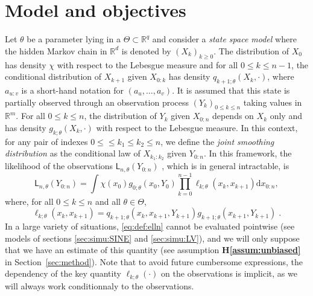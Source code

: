 \documentclass{article}
\newcommand{\md}[1]{g_{#1}}
\newcommand{\llh}[1]{\mathsf{L}_{#1}}
\newcommand{\parvec}{\theta}
\newcommand{\parspace}{\Theta}
\newcommand{\hd}[1]{q_{#1}}
\newcommand{\rset}{\ensuremath{\mathbb{R}}}
\newcommand{\rmd}{\ensuremath{\mathrm{d}}}
\newcommand{\eqsp}{\;}
\newcommand{\qg}[1]{\ell_{#1}}
\newcommand{\sfd}{\mathsf{d}}
\begin{document}
\section{Model and objectives}
\label{sec:model}



%

Let $\parvec$ be a parameter lying in a $\Theta\subset \rset^q$ and consider a  \textit{state space model} where the hidden Markov chain  in $\rset^d$ is denoted by $(X_k)_{k\geqslant 0}$. The distribution of $X_0$ has density $\chi$ with respect to the Lebesgue measure and for all $0\leqslant k \leqslant n-1$, the conditional distribution of $X_{k+1} $ given $X_{0:k}$ has density $\hd{k+1;\parvec}(X_{k},\cdot)$, where $a_{u:v}$ is a short-hand notation for $(a_u,\ldots,a_v)$. 
It is assumed that this state  is partially observed  through an observation process $(Y_k)_{0\leqslant k \leqslant n}$ taking values in $\rset^m$. 
For all $0\leqslant k \leqslant n$, the distribution of $Y_k$ given $X_{0:n}$ depends on $X_k$ only and has density $\md{k;\parvec}(X_k,\cdot)$ with respect to the Lebesgue measure. 
In this context, for any pair of indexes $0\leqslant\leqslant k_1 \leqslant k_2 \leqslant n$, we define the \textit{joint smoothing distribution} as the conditional law of $X_{k_1:k_2}$ given $Y_{0:n}$. 
In this framework, the likelihood of the observations $\llh{n,\parvec}(Y_{0:n})$ , which is  in general intractable, is
$$
\llh{n,\parvec}(Y_{0:n})  = \int \chi(x_0)\md{0;\parvec}(x_{0},Y_{0})\prod_{k=0}^{n-1}\qg{k;\parvec}(x_{k},x_{k+1})\rmd x_{0:n},
$$
 where, for all $0\leqslant k \leqslant n$ and all $\parvec\in\parspace$,
\begin{equation}
\label{eq:def:elln}
\qg{k;\parvec}(x_{k},x_{k+1}) = \hd{k+1;\parvec}(x_{k}, x_{k+1}, Y_{k + 1})\md{k+1;\parvec}(x_{k+1},Y_{k+1})\eqsp.
\end{equation}
In a large variety of situations, \eqref{eq:def:elln} cannot be evaluated pointwise  (see models of sections \ref{sec:simu:SINE} and \ref{sec:simu:LV}), and we will only suppose that we have an estimate of this quantity (see assumption \textbf{H\ref{assum:unbiased}} in Section~\ref{sec:method}).
Note that to avoid future cumbersome expressions, the dependency of the key quantity $\qg{k;\parvec}(\cdot)$ on the observations is implicit, as we will always work conditionnaly to the observations.
\end{document}
